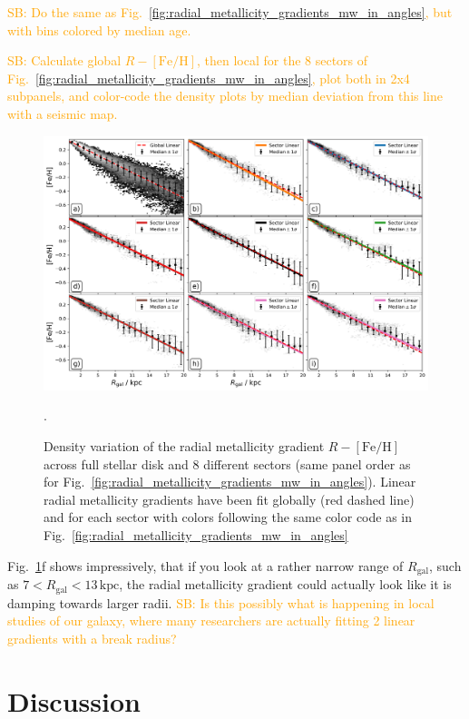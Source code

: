 \documentclass[fleqn,usenatbib]{mnras}
\newcommand{\SB}[1]{{\textcolor{orange}{SB: #1}}}
\begin{document}
\SB{Do the same as Fig.~\ref{fig:radial_metallicity_gradients_mw_in_angles}, but with bins colored by median age.}

\SB{Calculate global $R-\mathrm{[Fe/H]}$, then local for the 8 sectors of Fig.~\ref{fig:radial_metallicity_gradients_mw_in_angles}, plot both in 2x4 subpanels, and color-code the density plots by median deviation from this line with a seismic map.}


\begin{figure}
    \centering
    \includegraphics[width=\textwidth]{figures/linear_radial_metallicity_gradients_mw_in_angles.png}
    \caption{Density variation of the radial metallicity gradient $R-\mathrm{[Fe/H]}$ across full stellar disk and 8 different sectors (same panel order as for Fig.~\ref{fig:radial_metallicity_gradients_mw_in_angles}). Linear radial metallicity gradients have been fit globally (red dashed line) and for each sector with colors following the same color code as in Fig.~\ref{fig:radial_metallicity_gradients_mw_in_angles}}.
    \label{fig:linear_radial_metallicity_gradients_mw_in_angles}
\end{figure}

Fig.~\ref{fig:linear_radial_metallicity_gradients_mw_in_angles}f shows impressively, that if you look at a rather narrow range of $R_\mathrm{gal}$, such as $7 < R_\mathrm{gal} < 13\,\mathrm{kpc}$, the radial metallicity gradient could actually look like it is damping towards larger radii. \SB{Is this possibly what is happening in local studies of our galaxy, where many researchers are actually fitting 2 linear gradients with a break radius?}

\section{Discussion} \label{sec:discussion}
\end{document}

